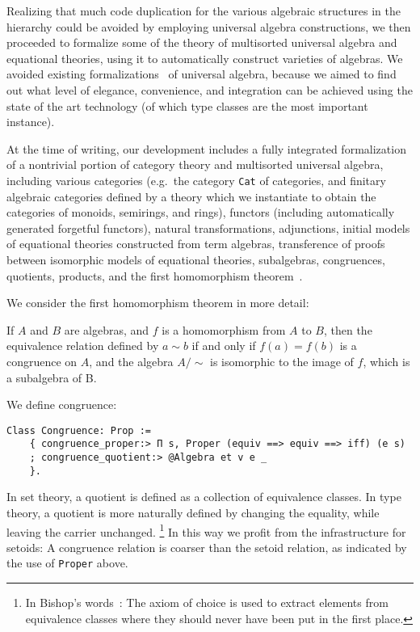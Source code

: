 \documentclass[a4paper,10pt,runningheads]{llncs}
\begin{document}
Realizing that much code duplication for the various algebraic structures in the hierarchy could be avoided by employing universal algebra constructions, we then proceeded to formalize some of the theory of multisorted universal algebra and equational theories, using it to automatically construct varieties of algebras. We avoided existing formalizations~\cite{DBLP:conf/tphol/Capretta99,dominguez2008formalizing} of universal algebra, because we aimed to find out what level of elegance, convenience, and integration can be achieved using the state of the art technology (of which type classes are the most important instance).

At the time of writing, our development includes a fully integrated formalization of a nontrivial portion of category theory and multisorted universal algebra, including various categories (e.g.\ the category \lstinline|Cat| of categories, and finitary algebraic categories  defined by a theory which we instantiate to obtain the categories of monoids, semirings, and rings), functors (including automatically generated forgetful functors), natural transformations, adjunctions, initial models of equational theories constructed from term algebras, transference of proofs between isomorphic models of equational theories, subalgebras, congruences, quotients, products, and the first homomorphism theorem~\cite{meinke1993universal}.

We consider the first homomorphism theorem in more detail:
\begin{theorem}
If $A$ and $B$ are algebras, and $f$ is a homomorphism from $A$ to $B$, then the equivalence relation defined by $a\sim b$ if and only if $f(a)=f(b)$ is a congruence on $A$, and the algebra $A/\sim$ is isomorphic to the image of $f$, which is a subalgebra of B.
\end{theorem}

We define congruence:
\begin{lstlisting}
Class Congruence: Prop :=
    { congruence_proper:> Π s, Proper (equiv ==> equiv ==> iff) (e s)
    ; congruence_quotient:> @Algebra et v e _
    }.
\end{lstlisting}

In set theory, a quotient is defined as a collection of equivalence classes. In type theory, a quotient is more naturally
defined by changing the equality, while leaving the carrier unchanged.%
\footnote{In Bishop's words~\cite[p.12]{Bishop/Bridges:1985}: The axiom of choice is used to extract
elements from equivalence classes where they should never have been put in the first place.}
 In this way we profit from the infrastructure for setoids: A congruence relation is coarser than the setoid relation, as indicated by the use of \lstinline|Proper| above.
\end{document}
